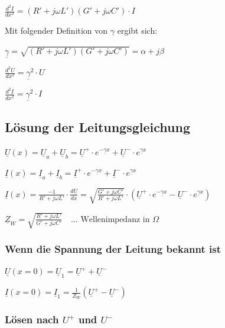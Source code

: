 $
\boxed{\frac{d^2 I}{dx^2} = \left(R' + j \omega L'\right)\left(G' + j \omega  C'\right) \cdot I}
$

\vspace{0.15cm}

Mit folgender Definition von $\gamma$ ergibt sich:

\vspace{0.15cm}

$
\boxed{\underline{\gamma} = \sqrt{(R' + j\omega L')(G' + j \omega C')} = \alpha + j\beta}
$

$
\boxed{\frac{d^2 U}{dx^2} = \underline{\gamma}^2 \cdot U}
$

$
\boxed{\frac{d^2 I}{dx^2} = \underline{\gamma}^2 \cdot I}
$


\subsection{Lösung der Leitungsgleichung}

$
\boxed{\underline{U}(x) = \underline{U}_a + \underline{U}_b = \underline{U}^+ \cdot e^{-\underline{\gamma} x} + \underline{U}^- \cdot e^{\underline{\gamma} x}}
$

$
\boxed{\underline{I}(x) = \underline{I}_a + \underline{I}_b = \underline{I}^+ \cdot e^{-\underline{\gamma} x} + \underline{I}^- \cdot e^{\underline{\gamma} x}}
$

$
\boxed{\underline{I}(x) = \frac{-1}{R' + j\omega L'} \cdot \frac{d\underline{U}}{dx}
= \sqrt{\frac{G' + j\omega C'}{R' + j\omega L'}} 
\cdot \left( \underline{U}^+ \cdot e^{-\underline{\gamma} x} - \underline{U}^- \cdot e^{\underline{\gamma} x} \right)}
$

$
\boxed{\underline{Z}_W = \sqrt{\frac{R' + j\omega L'}{G' + j\omega C'}} \quad \ldots \text{ Wellenimpedanz in } \Omega}
$

\subsubsection{Wenn die Spannung der Leitung bekannt ist}

$
\boxed{\underline{U}(x = 0) = \underline{U}_1 = \underline{U}^+ + \underline{U}^-}
$

$
\boxed{\underline{I}(x = 0) = \underline{I}_1 = \frac{1}{Z_W} \left( \underline{U}^+ - \underline{U}^- \right)}
$

\subsubsection{Lösen nach $U^+$ und $U^-$}

